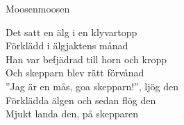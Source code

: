 \begin{song}{Moosen}{moosen}
\begin{vers}
Det satt en älg i en klyvartopp\\
Förklädd i älgjaktens månad\\
Han var befjädrad till horn och kropp\\
Och skepparn blev rätt förvånad\\
''Jag är en mås, goa skepparn!'', ljög den\\
Förklädda älgen och sedan flög den\\
Mjukt landa den, på skepparen\\
\end{vers}
\end{song}
